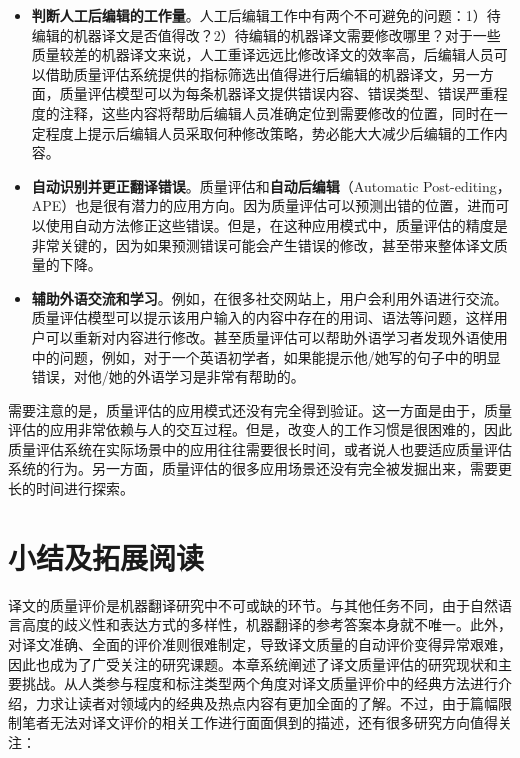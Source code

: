 \begin{itemize}
\vspace{0.5em}
\item {\small\sffamily\bfseries{判断人工后编辑的工作量}}。人工后编辑工作中有两个不可避免的问题：1）待编辑的机器译文是否值得改？2）待编辑的机器译文需要修改哪里？对于一些质量较差的机器译文来说，人工重译远远比修改译文的效率高，后编辑人员可以借助质量评估系统提供的指标筛选出值得进行后编辑的机器译文，另一方面，质量评估模型可以为每条机器译文提供{错误内容、错误类型、错误严重程度}的注释，这些内容将帮助后编辑人员准确定位到需要修改的位置，同时在一定程度上提示后编辑人员采取何种修改策略，势必能大大减少后编辑的工作内容。
\vspace{0.5em}
\item {\small\sffamily\bfseries{自动识别并更正翻译错误}}。质量评估和{\small\sffamily\bfseries{自动后编辑}}（Automatic Post-editing，APE）也是很有潜力的应用方向。因为质量评估可以预测出错的位置，进而可以使用自动方法修正这些错误。但是，在这种应用模式中，质量评估的精度是非常关键的，因为如果预测错误可能会产生错误的修改，甚至带来整体译文质量的下降。
\vspace{0.5em}
\item {\small\sffamily\bfseries{辅助外语交流和学习}}。例如，在很多社交网站上，用户会利用外语进行交流。质量评估模型可以提示该用户输入的内容中存在的用词、语法等问题，这样用户可以重新对内容进行修改。甚至质量评估可以帮助外语学习者发现外语使用中的问题，例如，对于一个英语初学者，如果能提示他/她写的句子中的明显错误，对他/她的外语学习是非常有帮助的。
\vspace{0.5em}
\end{itemize}

\parinterval 需要注意的是，质量评估的应用模式还没有完全得到验证。这一方面是由于，质量评估的应用非常依赖与人的交互过程。但是，改变人的工作习惯是很困难的，因此质量评估系统在实际场景中的应用往往需要很长时间，或者说人也要适应质量评估系统的行为。另一方面，质量评估的很多应用场景还没有完全被发掘出来，需要更长的时间进行探索。


\sectionnewpage
\section{小结及拓展阅读}

\parinterval 译文的质量评价是机器翻译研究中不可或缺的环节。与其他任务不同，由于自然语言高度的歧义性和表达方式的多样性，机器翻译的参考答案本身就不唯一。此外，对译文准确、全面的评价准则很难制定，导致译文质量的自动评价变得异常艰难，因此也成为了广受关注的研究课题。本章系统阐述了译文质量评估的研究现状和主要挑战。从人类参与程度和标注类型两个角度对译文质量评价中的经典方法进行介绍，力求让读者对领域内的经典及热点内容有更加全面的了解。不过，由于篇幅限制笔者无法对译文评价的相关工作进行面面俱到的描述，还有很多研究方向值得关注：

